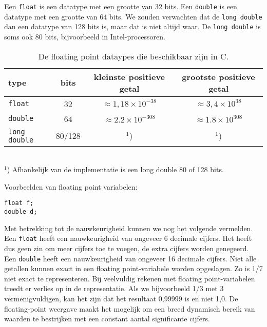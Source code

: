 Een \texttt{float} is een datatype met een grootte van 32 bits. Een \texttt{double} is een datatype met een grootte van 64 bits. We zouden verwachten dat de \texttt{long double} dan een datatype van 128 bits is, maar dat is niet altijd waar. De \texttt{long double} is soms ook 80 bits, bijvoorbeeld in Intel-processoren.

\begin{table}[!ht]
\centering
\caption{De floating point dataypes die beschikbaar zijn in C.}
\label{tab:varfloatdatatypes}
\begin{tabular}{@{}lccc@{}}
\toprule
\textbf{type}          & \textbf{bits} & \textbf{kleinste positieve getal} &  \textbf{grootste positieve getal} \\ \midrule
\texttt{float}         & 32                      & $\approx1,18\times10^{-38}$ & $\approx3,4\times10^{38}$  \\
\texttt{double   }     & 64                      & $\approx2.2\times10^{-308}$ & $\approx1.8\times10^{308}$ \\
\texttt{long double}   & 80/128                      & $^1$) & $^1$)  \\
\bottomrule
\end{tabular}\\\vspace*{1mm}
\footnotesize$^1$) Afhankelijk van de implementatie is een long double 80 of 128 bits.
\end{table}

Voorbeelden van floating point variabelen:

\hspace*{1em}\texttt{float f;}\\
\hspace*{1em}\texttt{double d;}

Met betrekking tot de nauwkeurigheid kunnen we nog het volgende vermelden. Een \texttt{float} heeft een nauwkeurigheid van ongeveer 6 decimale cijfers. Het heeft dus geen zin om meer cijfers toe te voegen, de extra cijfers worden genegeerd. Een \texttt{double} heeft een nauwkeurigheid van ongeveer 16 decimale cijfers. Niet alle getallen kunnen exact in een floating point-variabele worden opgeslagen. Zo is 1/7 niet exact te representeren. Bij veelvuldig rekenen met floating point-variabelen treedt er verlies op in de representatie. Als we bijvoorbeeld 1/3 met 3 vermenigvuldigen, kan het zijn dat het resultaat 0,99999 is en niet 1,0. De floating-point weergave maakt het mogelijk om een breed dynamisch bereik van waarden te bestrijken met een constant aantal significante cijfers.

